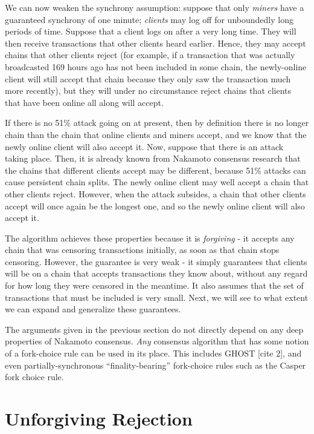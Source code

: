 \documentclass[12pt]{article}
\begin{document}
We can now weaken the synchrony assumption: suppose that only \textit{miners} have a guaranteed synchrony of one minute; \textit{clients} may log off for unboundedly long periods of time. Suppose that a client logs on after a very long time. They will then receive transactions that other clients heard earlier. Hence, they may accept chains that other clients reject (for example, if a transaction that was actually broadcasted 169 hours ago has not been included in some chain, the newly-online client will still accept that chain because they only saw the transaction much more recently), but they will under no circumstance reject chains that clients that have been online all along will accept.

If there is no 51\% attack going on at present, then by definition there is no longer chain than the chain that online clients and miners accept, and we know that the newly online client will also accept it. Now, suppose that there is an attack taking place. Then, it is already known from Nakamoto consensus research that the chains that different clients accept may be different, because 51\% attacks can cause persistent chain splits. The newly online client may well accept a chain that other clients reject. However, when the attack subsides, a chain that other clients accept will once again be the longest one, and so the newly online client will also accept it.

The algorithm achieves these properties because it is \textit{forgiving} - it accepts any chain that was censoring transactions initially, as soon as that chain stops censoring. However, the guarantee is very weak - it simply guarantees that clients will be on a chain that accepts transactions they know about, without any regard for how long they were censored in the meantime. It also assumes that the set of transactions that must be included is very small. Next, we will see to what extent we can expand and generalize these guarantees.

The arguments given in the previous section do not directly depend on any deep properties of Nakamoto consensus. \textit{Any} consensus algorithm that has some notion of a fork-choice rule can be used in its place. This includes GHOST [cite 2], and even partially-synchronous ``finality-bearing'' fork-choice rules such as the Casper fork choice rule.

\section{Unforgiving Rejection}
\end{document}

